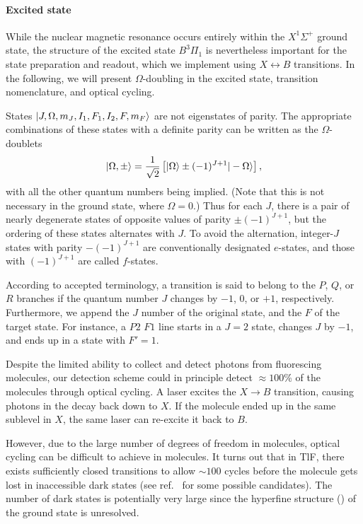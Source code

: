 \paragraph{Excited state}

While the nuclear magnetic resonance occurs entirely within the $X^1\Sigma^+$
ground state, the structure of the excited state $B^3\Pi_1$ is nevertheless
important for the state preparation and readout, which we implement using
$X\leftrightarrow B$ transitions. In the following, we will present
$\Omega$-doubling in the excited state, transition nomenclature, and optical
cycling.

States $|J,\Omega,m_J,I_1,F_1,I_2,F,m_F\rangle$ are not eigenstates of parity. The
appropriate combinations of these states with a definite parity can be written
as the $\Omega$-doublets
%
\begin{equation}
    \label{doublets}
    |\Omega,\pm\rangle
    =
    \frac{1}{\sqrt2}
    \left[
       |\Omega\rangle
       \pm(-1)^{J+1}
       |-\Omega\rangle
    \right],
\end{equation}
%
with all the other quantum numbers being implied. (Note that this is not
necessary in the ground state, where $\Omega=0$.) Thus for each $J$, there is a
pair of nearly degenerate states of opposite values of parity $\pm(-1)^{J+1}$,
but the ordering of these states alternates with $J$. To avoid the alternation,
integer-$J$ states with parity $-(-1)^{J+1}$ are conventionally designated
$e$-states, and those with $(-1)^{J+1}$ are called $f$-states.
\cite[sect.~6.9.4]{brown2003rotational}

According to accepted terminology, a transition is said to belong to the $P$,
$Q$, or $R$ branches if the quantum number $J$ changes by $-1$, 0, or $+1$,
respectively. \cite[sect.~10.2]{bransden1990physics} Furthermore, we append the
$J$ number of the original state, and the $F$ of the target state. For instance,
a $P2$ $F1$ line starts in a $J=2$ state, changes $J$ by $-1$, and ends up in a
state with $F'=1$. \label{P2F1}

Despite the limited ability to collect and detect photons from fluorescing
molecules, our detection scheme could in principle detect $\approx100$\% of the
molecules through optical cycling. A laser excites the $X\to B$ transition,
causing photons in the decay back down to $X$. If the molecule ended up in the
same sublevel in $X$, the same laser can re-excite it back to $B$.
\cite{hunter2012prospects}

However, due to the large number of degrees of freedom in molecules, optical
cycling can be difficult to achieve in molecules. It turns out that in TlF,
there exists sufficiently closed transitions to allow $\sim100$ cycles before
the molecule gets lost in inaccessible dark states (see
ref.~\cite{norrgard2017hyperfine} for some possible candidates). The number of
dark states is potentially very large since the hyperfine structure (\hfs) of
the ground state is unresolved.


